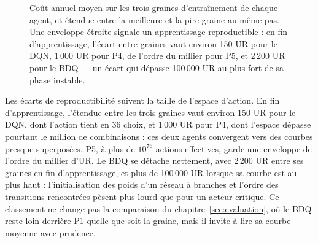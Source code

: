 \begin{figure}[H]
\begin{minipage}[t]{0.49\linewidth}
\end{minipage}\hfill
\begin{minipage}[t]{0.49\linewidth}
\end{minipage}
\caption{Coût annuel moyen sur les trois graines d'entraînement de chaque agent, et étendue entre la meilleure et la pire graine au même pas. Une enveloppe étroite signale un apprentissage reproductible : en fin d'apprentissage, l'écart entre graines vaut environ 150 UR pour le DQN, 1\,000 UR pour P4, de l'ordre du millier pour P5, et 2\,200 UR pour le BDQ — un écart qui dépasse 100\,000 UR au plus fort de sa phase instable.}
\label{fig:dispersion}
\end{figure}

Les écarts de reproductibilité suivent la taille de l'espace d'action. En fin d'apprentissage, l'étendue entre les trois graines vaut environ 150 UR pour le DQN, dont l'action tient en 36 choix, et 1\,000 UR pour P4, dont l'espace dépasse pourtant le million de combinaisons : ces deux agents convergent vers des courbes presque superposées. P5, à plus de $10^{76}$ actions effectives, garde une enveloppe de l'ordre du millier d'UR. Le BDQ se détache nettement, avec 2\,200 UR entre ses graines en fin d'apprentissage, et plus de 100\,000 UR lorsque sa courbe est au plus haut : l'initialisation des poids d'un réseau à branches et l'ordre des transitions rencontrées pèsent plus lourd que pour un acteur-critique. Ce classement ne change pas la comparaison du chapitre~\ref{sec:evaluation}, où le BDQ reste loin derrière P1 quelle que soit la graine, mais il invite à lire sa courbe moyenne avec prudence.


